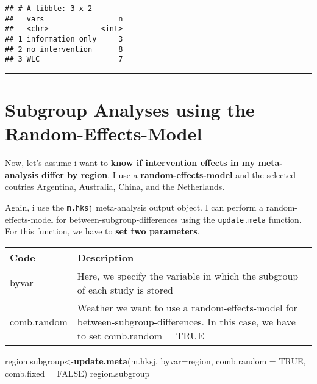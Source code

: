 \documentclass[]{book}
\newenvironment{Shaded}{\begin{snugshade}}{\end{snugshade}}
\newcommand{\KeywordTok}[1]{\textcolor[rgb]{0.13,0.29,0.53}{\textbf{#1}}}
\newcommand{\DataTypeTok}[1]{\textcolor[rgb]{0.13,0.29,0.53}{#1}}
\newcommand{\OtherTok}[1]{\textcolor[rgb]{0.56,0.35,0.01}{#1}}
\newcommand{\NormalTok}[1]{#1}
\theoremstyle{definition}
\theoremstyle{definition}
\theoremstyle{definition}
\theoremstyle{remark}
\begin{document}
\begin{verbatim}
## # A tibble: 3 x 2
##   vars                 n
##   <chr>            <int>
## 1 information only     3
## 2 no intervention      8
## 3 WLC                  7
\end{verbatim}

\begin{center}\rule{0.5\linewidth}{\linethickness}\end{center}

\section{Subgroup Analyses using the
Random-Effects-Model}\label{subgroup-analyses-using-the-random-effects-model}

Now, let's assume i want to \textbf{know if intervention effects in my
meta-analysis differ by region}. I use a \textbf{random-effects-model}
and the selected coutries Argentina, Australia, China, and the
Netherlands.

Again, i use the \texttt{m.hksj} meta-analysis output object. I can
perform a random-effects-model for between-subgroup-differences using
the \texttt{update.meta} function. For this function, we have to
\textbf{set two parameters}.

\begin{tabular}{l|l}
\hline
Code & Description\\
\hline
byvar & Here, we specify the variable in which the subgroup of each study is stored\\
\hline
comb.random & Weather we want to use a random-effects-model for between-subgroup-differences. In this case, we have to set comb.random = TRUE\\
\hline
\end{tabular}

\begin{Shaded}
\begin{Highlighting}[]
\NormalTok{region.subgroup<-}\KeywordTok{update.meta}\NormalTok{(m.hksj, }
                             \DataTypeTok{byvar=}\NormalTok{region, }
                             \DataTypeTok{comb.random =} \OtherTok{TRUE}\NormalTok{, }
                             \DataTypeTok{comb.fixed =} \OtherTok{FALSE}\NormalTok{)}
\NormalTok{region.subgroup}
\end{Highlighting}
\end{Shaded}
\end{document}
